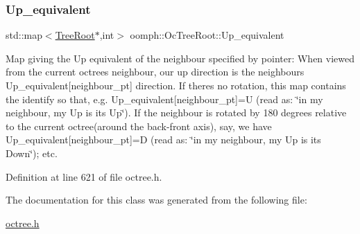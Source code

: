 \mbox{\label{classoomph_1_1OcTreeRoot_af35e1f7300551c1c8d9ad828d3ebccd9}} 
\subsubsection{\texorpdfstring{Up\+\_\+equivalent}{Up\_equivalent}}
{\footnotesize\ttfamily std\+::map$<$\hyperlink{classoomph_1_1TreeRoot}{Tree\+Root}$\ast$,int$>$ oomph\+::\+Oc\+Tree\+Root\+::\+Up\+\_\+equivalent\hspace{0.3cm}{\ttfamily [private]}}



Map giving the Up equivalent of the neighbour specified by pointer\+: When viewed from the current octree\textquotesingle{}s neighbour, our up direction is the neighbour\textquotesingle{}s Up\+\_\+equivalent\mbox{[}neighbour\+\_\+pt\mbox{]} direction. If there\textquotesingle{}s no rotation, this map contains the identify so that, e.\+g. {\ttfamily Up\+\_\+equivalent}\mbox{[}neighbour\+\_\+pt\mbox{]}=U (read as\+: \char`\"{}in my
neighbour, my Up is its Up\char`\"{}). If the neighbour is rotated by 180 degrees relative to the current octree(around the back-\/front axis), say, we have {\ttfamily Up\+\_\+equivalent}\mbox{[}neighbour\+\_\+pt\mbox{]}=D (read as\+: \char`\"{}in my 
neighbour, my Up is its Down\char`\"{}); etc. 



Definition at line 621 of file octree.\+h.



The documentation for this class was generated from the following file\+:\begin{DoxyCompactItemize}
\item 
\hyperlink{octree_8h}{octree.\+h}\end{DoxyCompactItemize}
